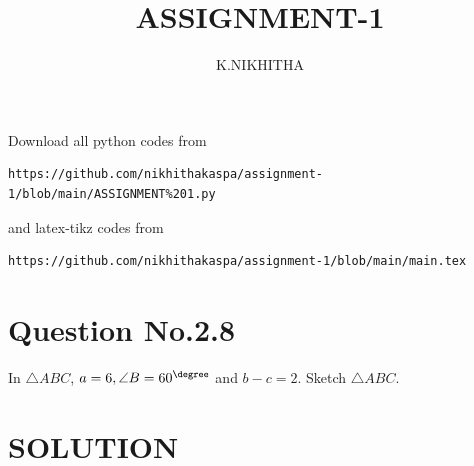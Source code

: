 \documentclass[journal,12pt,twocolumn]{IEEEtran}
\begin{document}
     \def\rightbox#1{\makebox[0in][r]{#1}}
     \def\centbox#1{\makebox[0in]{#1}}
     \def\topbox#1{\raisebox{-\baselineskip}[0in][0in]{#1}}
     \def\midbox#1{\raisebox{-0.5\baselineskip}[0in][0in]{#1}}
\vspace{3cm}
\title{ASSIGNMENT-1}
\author{K.NIKHITHA}
\maketitle
\newpage
\bigskip
\renewcommand{\thefigure}{\theenumi}
\renewcommand{\thetable}{\theenumi}
Download all python codes from 
\begin{lstlisting}
https://github.com/nikhithakaspa/assignment-1/blob/main/ASSIGNMENT%201.py
\end{lstlisting}
%
and latex-tikz codes from 
%
\begin{lstlisting}
https://github.com/nikhithakaspa/assignment-1/blob/main/main.tex
\end{lstlisting}
%
\section{Question No.2.8}
\item In $\triangle ABC$,  $a = 6, \angle B = 60^{\degree}$ and $b-c = 2$.
Sketch $\triangle ABC$.
 
\section{SOLUTION}
 
\end{document}
